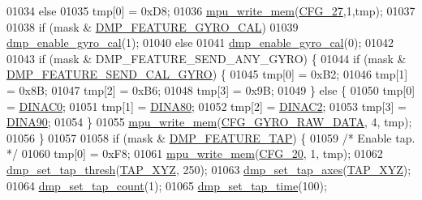 \begin{DoxyCode}
01034     \textcolor{keywordflow}{else}
01035         tmp[0] = 0xD8;
01036     \hyperlink{group___d_r_i_v_e_r_s_gafea59910bc3dd30ba3356b1c75213a5f}{mpu\_write\_mem}(\hyperlink{group___d_r_i_v_e_r_s_gaae53afa64170cb4723c04f16c2fa5f30}{CFG\_27},1,tmp);
01037 
01038     \textcolor{keywordflow}{if} (mask & \hyperlink{group___d_r_i_v_e_r_s_gaaf0ac890c1f83106c08b722f1e865fdb}{DMP\_FEATURE\_GYRO\_CAL})
01039         \hyperlink{group___d_r_i_v_e_r_s_ga653ebcec6758f006dd89939e8f3c6ebb}{dmp\_enable\_gyro\_cal}(1);
01040     \textcolor{keywordflow}{else}
01041         \hyperlink{group___d_r_i_v_e_r_s_ga653ebcec6758f006dd89939e8f3c6ebb}{dmp\_enable\_gyro\_cal}(0);
01042 
01043     \textcolor{keywordflow}{if} (mask & DMP\_FEATURE\_SEND\_ANY\_GYRO) \{
01044         \textcolor{keywordflow}{if} (mask & \hyperlink{group___d_r_i_v_e_r_s_ga40462c6fd55b04b2f79723dd737ee795}{DMP\_FEATURE\_SEND\_CAL\_GYRO}) \{
01045             tmp[0] = 0xB2;
01046             tmp[1] = 0x8B;
01047             tmp[2] = 0xB6;
01048             tmp[3] = 0x9B;
01049         \} \textcolor{keywordflow}{else} \{
01050             tmp[0] = \hyperlink{dmp_key_8h_a090e2de2c4154541f57ae6b818884cf4}{DINAC0};
01051             tmp[1] = \hyperlink{dmp_key_8h_afc42e54169b23fd9319d59cccde6199f}{DINA80};
01052             tmp[2] = \hyperlink{dmp_key_8h_ac75342203eb32cb43e0f9404accb37a3}{DINAC2};
01053             tmp[3] = \hyperlink{dmp_key_8h_a067d7d3582cec5360b65783c031b8a05}{DINA90};
01054         \}
01055         \hyperlink{group___d_r_i_v_e_r_s_gafea59910bc3dd30ba3356b1c75213a5f}{mpu\_write\_mem}(\hyperlink{group___d_r_i_v_e_r_s_ga01dcbc69fa28559529653a3b4aabea00}{CFG\_GYRO\_RAW\_DATA}, 4, tmp);
01056     \}
01057 
01058     \textcolor{keywordflow}{if} (mask & \hyperlink{group___d_r_i_v_e_r_s_ga87fac39cf95e2c56afdf507a986fa00b}{DMP\_FEATURE\_TAP}) \{
01059         \textcolor{comment}{/* Enable tap. */}
01060         tmp[0] = 0xF8;
01061         \hyperlink{group___d_r_i_v_e_r_s_gafea59910bc3dd30ba3356b1c75213a5f}{mpu\_write\_mem}(\hyperlink{group___d_r_i_v_e_r_s_ga12aa4c3bdc65c24ca29ef08e62fd3e13}{CFG\_20}, 1, tmp);
01062         \hyperlink{group___d_r_i_v_e_r_s_ga15da67c0a6c94e0cdaceb8b165e13af9}{dmp\_set\_tap\_thresh}(\hyperlink{group___d_r_i_v_e_r_s_gaa2b8e1661eb53aeac3ff4877ff2b79d9}{TAP\_XYZ}, 250);
01063         \hyperlink{group___d_r_i_v_e_r_s_ga66bc5c8fc26fcb498df53fc62aa87e4f}{dmp\_set\_tap\_axes}(\hyperlink{group___d_r_i_v_e_r_s_gaa2b8e1661eb53aeac3ff4877ff2b79d9}{TAP\_XYZ});
01064         \hyperlink{group___d_r_i_v_e_r_s_ga819f947b2cb107ada7b9a94c41be0dad}{dmp\_set\_tap\_count}(1);
01065         \hyperlink{group___d_r_i_v_e_r_s_ga97466067f4a23368f4d7e2547fe359d9}{dmp\_set\_tap\_time}(100);

\end{DoxyCode}
